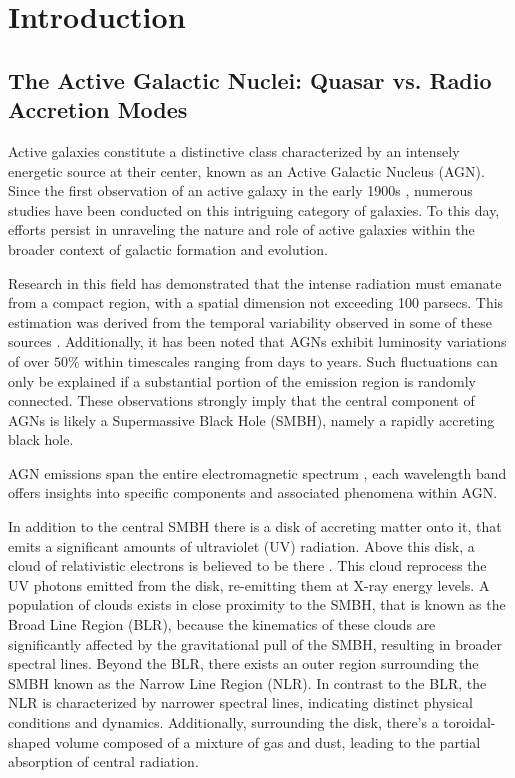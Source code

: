 \chapter{Introduction}

\section{The Active Galactic Nuclei: Quasar vs. Radio Accretion Modes}
Active galaxies constitute a distinctive class characterized by an intensely energetic source at their center, known as an Active Galactic Nucleus (AGN). Since the first observation of an active galaxy in the early 1900s \cite{Shields_1999}, numerous studies have been conducted on this intriguing category of galaxies. To this day, efforts persist in unraveling the nature and role of active galaxies within the broader context of galactic formation and evolution.

Research in this field has demonstrated that the intense radiation must emanate from a compact region, with a spatial dimension not exceeding 100 parsecs. This estimation was derived from the temporal variability observed in some of these sources \cite{1959ApJ...130...38W}. Additionally, it has been noted that AGNs exhibit luminosity variations of over $50\%$ within timescales ranging from days to years. Such fluctuations can only be explained if a substantial portion of the emission region is randomly connected. These observations strongly imply that the central component of AGNs is likely a Supermassive Black Hole (SMBH), namely a rapidly accreting black hole.

AGN emissions span the entire electromagnetic spectrum \cite{2017NatAs...1E.194P}, each wavelength band offers insights into specific components and associated phenomena within AGN. 

In addition to the central SMBH \cite{2006ApJ...652..216R} there is a disk of accreting matter onto it, that emits a significant amounts of ultraviolet (UV) radiation. Above this disk, a cloud of relativistic electrons is believed to be there \cite{2005ASPC..343..435K}. This cloud reprocess the UV photons emitted from the disk, re-emitting them at X-ray energy levels.
A population of clouds exists in close proximity to the SMBH, that is known as the Broad Line Region
(BLR), because the kinematics of these clouds are significantly affected by the gravitational pull of the SMBH, resulting in broader spectral lines. Beyond the BLR, there exists an outer region surrounding the SMBH known as the Narrow Line Region (NLR). In contrast to the BLR, the NLR is characterized by narrower spectral lines, indicating distinct physical conditions and dynamics. 
Additionally, surrounding the disk, there's a toroidal-shaped volume composed of a mixture of gas and dust, leading to the partial absorption of central radiation.

